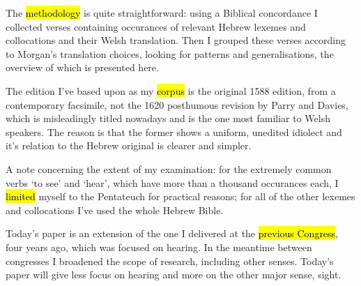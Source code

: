 \begin{paper}
	{\click} The \hl{methodology} is quite straightforward:  using a Biblical concordance I collected verses containing occurances of relevant Hebrew lexemes and collocations and their Welsh translation.  Then I grouped these verses according to Morgan’s translation choices,  looking for patterns and generalisations, the overview of which is presented here.

	\begin{leftbar}
		{\click} The edition I’ve based upon as my \hl{corpus} is the original 1588 edition, from a contemporary facsimile, not the 1620 posthumous revision by Parry and Davies, which is misleadingly titled  nowadays and is the one most familiar to Welsh speakers. The reason is that the former shows a uniform, unedited idiolect and it’s relation to the Hebrew original is clearer and simpler.
	\end{leftbar}

	{\click} A note concerning the extent of my examination: for the extremely common verbs  ‘to see’ and  ‘hear’, which have more than a thousand occurances each, I \hl{limited} myself to the Pentateuch for practical reasons; for all of the other lexemes and collocations I’ve used the whole Hebrew Bible.

	{\click} Today’s paper is an extension of the one I delivered at the \hl{previous Congress}, four years ago, which was focused on hearing. In the meantime between congresses I broadened the scope of research, including other senses. Today’s paper will give less focus on hearing and more on the other major sense, sight.
\end{paper}
